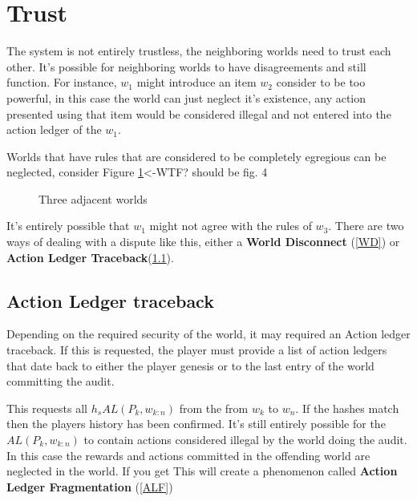 \documentclass[runningheads,a4paper]{llncs}
\begin{document}
\section{Trust}
The system is not entirely trustless, the neighboring worlds need to trust each other. It's possible for neighboring worlds to have disagreements and still function. For instance, $w_1$ might introduce an item $w_2$ consider to be too powerful, in this case the world can just neglect it's existence, any action presented using that item would be considered illegal and not entered into the action ledger of the $w_1$.

Worlds that have rules that are considered to be completely egregious can be neglected, consider Figure \ref{ThreeWorld}<-WTF? should be fig. 4 

\begin{figure}
\label{ThreeWorld}
\caption{Three adjacent worlds}
\begin{center}
\end{center}
\end{figure}

It's entirely possible that $w_1$ might not agree with the rules of $w_3$. There are two ways of dealing with a dispute like this, either a \textbf{World Disconnect} (\ref{WD}) or \textbf{Action Ledger Traceback}(\ref{ALT}).

\subsection{Action Ledger traceback}
\label{ALT}
Depending on the required security of the world, it may required an Action ledger traceback. If this is requested, the player must provide a list of action ledgers that date back to either the player genesis or to the last entry of the world committing the audit. 

This requests all $h_s{AL(P_k, w_{k:n})}$ from the from $w_k$ to $w_n$. If the hashes match then the players history has been confirmed. It's still entirely possible for the $AL(P_k, w_{k:n})$ to contain actions considered illegal by the world doing the audit. In this case the rewards and actions committed in the offending world are neglected in the world. If you get This will create a phenomenon called \textbf{Action Ledger Fragmentation} (\ref{ALF}) 
\end{document}
